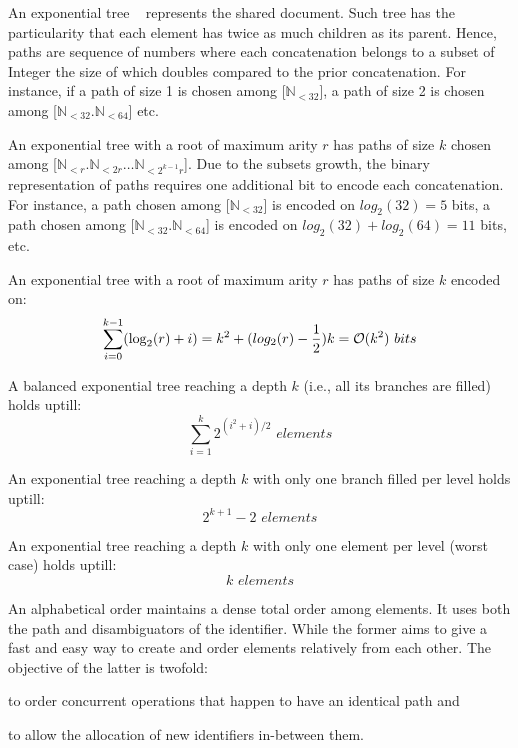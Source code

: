 \begin{asparadesc}
\item [An exponential tree]~\cite{andersson1996faster, andersson2007dynamic}
  represents the shared document. Such tree has the particularity that each
  element has twice as much children as its parent.  Hence, paths are sequence
  of numbers where each concatenation belongs to a subset of Integer the size of
  which doubles compared to the prior concatenation. For instance, if a path of
  size 1 is chosen among [$\mathbb{N}_{<32}$], a path of size 2 is chosen among
  [$\mathbb{N}_{<32}.\mathbb{N}_{<64}$] etc.

  An exponential tree with a root of maximum arity $r$ has paths of size $k$
  chosen among [$\mathbb{N}_{<r}.\mathbb{N}_{<2r}\ldots\mathbb{N}_{<2^{k-1}r}$].
  Due to the subsets growth, the binary representation of paths requires one
  additional bit to encode each concatenation. For instance, a path chosen among
  [$\mathbb{N}_{<32}$] is encoded on $log_2(32)=5$ bits, a path chosen among
  [$\mathbb{N}_{<32}.\mathbb{N}_{<64}$] is encoded on $log_2(32)+log_2(64)=11$
  bits, etc.
  
  An exponential tree with a root of maximum arity $r$ has paths of size $k$
  encoded on:
  \begin{equation}
    \sum\limits_{i=0}^{k-1}(\log_2(r)+i) =k^2+(log_2(r)-{1\over{2}})k =
    \mathcal{O}(k^2) \,\, bits
  \end{equation}

  A balanced exponential tree reaching a depth $k$ (i.e., all its branches are
  filled) holds uptill:
  \begin{equation}
    \sum\limits_{i=1}^{k} {2^{(i^2+i)/2}} \,\, elements
  \end{equation}

  An exponential tree reaching a depth $k$ with only one branch filled per level
  holds uptill:
  \begin{equation}
    2^{k+1}-2 \,\, elements
  \end{equation}

  An exponential tree reaching a depth $k$ with only one element per level
  (worst case) holds uptill: 
  \begin{equation}
    k \,\, elements
  \end{equation}
  
  An alphabetical order maintains a dense total order among elements. It uses
  both the path and disambiguators of the identifier. While the former aims to
  give a fast and easy way to create and order elements relatively from each
  other. The objective of the latter is twofold:
  \begin{inparaenum}[(i)]
  \item to order concurrent operations that happen to have an identical path and
  \item to allow the allocation of new identifiers in-between them.
  \end{inparaenum}


\end{asparadesc}
